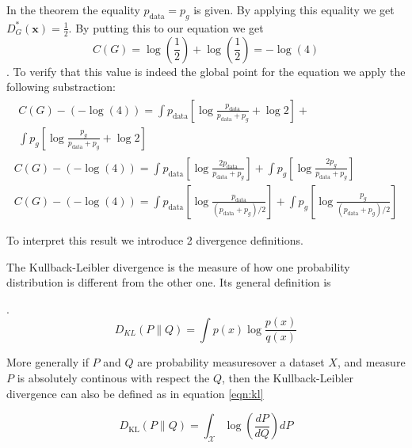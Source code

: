 In the theorem the equality $ p_{\text{data}} = p_g$ is given. By applying this equality we get
$D^{*}_G(\boldsymbol{x}) = \frac{1}{2}$. By putting this to our equation we get $$C(G) =
\log(\frac{1}{2}) + \log(\frac{1}{2}) = - \log(4)$$. To verify that this value is indeed the global
point for the equation we apply the following substraction: 
\begin{multline}
    \label{eqn:gan_optim_proof}
    \begin{split}
        C(G)-(-\log (4))  =\int p_{\text {data}}\left[\log \frac{p_{\text {data}}}{p_{\text {data}}+p_{g}}+\log 2\right]+\\ \int p_{g}\left[\log \frac{p_{g}}{p_{\text {data}}+p_{g}}+\log 2\right]
    \end{split}\\[5pt]
    C(G)-(-\log (4)) =\int p_{\text {data}}\left[\log \frac{2 p_{\text {data}}}{p_{\text {data}}+p_{g}}\right]+\int p_{g}\left[\log \frac{2 p_{g}}{p_{\text {data}}+p_{g}}\right]\\[5pt]
    C(G)-(-\log (4)) =\int p_{\text {data}}\left[\log \frac{p_{\text {data}}}{\left(p_{\text {data}}+p_{g}\right) / 2}\right]+\int p_{g}\left[\log \frac{p_{g}}{\left(p_{\text {data}}+p_{g}\right) / 2}\right]
\end{multline}

To interpret this result we introduce 2 divergence definitions.
\begin{definition}
    The Kullback-Leibler divergence is the measure of how one probability distribution is different from
    the other one. Its general definition is  
\end{definition}
.
\begin{equation}
    D_{K L}(P \| Q)=\int p(x) \log \frac{p(x)}{q(x)}
\end{equation}

More generally if $P$ and $Q$ are probability measures\footnotemark  over a dataset $X$, and measure
$P$ is absolutely continous with respect the $Q$, then the Kullback-Leibler divergence can also be
defined as in equation \ref{eqn:kl}


\begin{equation}
    \label{eqn:kl}
    D_{\mathrm{KL}}(P \| Q)=\int_{\mathcal{X}} \log \left(\frac{d P}{d Q}\right) d P
\end{equation}

